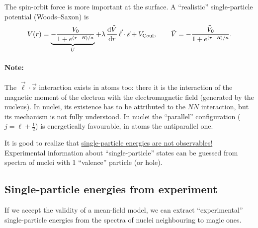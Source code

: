 \documentclass[11pt,a4paper]{article}
\newcommand{\ud}{\mathrm{d}}
\begin{document}
The spin-orbit force is more important at the surface. A ``realistic'' single-particle potential (Woods--Saxon) is
\[
V(r)=\underbrace{-\frac{V_0}{1+e^{(r-R)/a}}}_{U}+\lambda\,\frac{\ud\tilde V}{\ud r}\,\vec\ell\cdot\vec s+V_{\rm Coul},
\qquad
\tilde V=-\frac{\tilde V_0}{1+e^{(r-R)/a}} .
\]
\begin{center}
\end{center}

\paragraph{Note:} The $\vec\ell\cdot\vec s$ interaction exists in atoms too: there it is the interaction of the magnetic moment of the electron with the electromagnetic field (generated by the nucleus). In nuclei, its existence has to be attributed to the $NN$ interaction, but its mechanism is not fully understood. In nuclei the ``parallel'' configuration ($j=\ell+\frac12$) is energetically favourable, in atoms the antiparallel one.

It is good to realize that \underline{single-particle energies are not observables!}
Experimental information about ``single-particle'' states can be guessed from spectra of nuclei with 1 ``valence'' particle (or hole).

\subsection{Single-particle energies from experiment}
If we accept the validity of a mean-field model, we can extract ``experimental'' single-particle energies from the spectra of nuclei neighbouring to magic ones.
\end{document}

